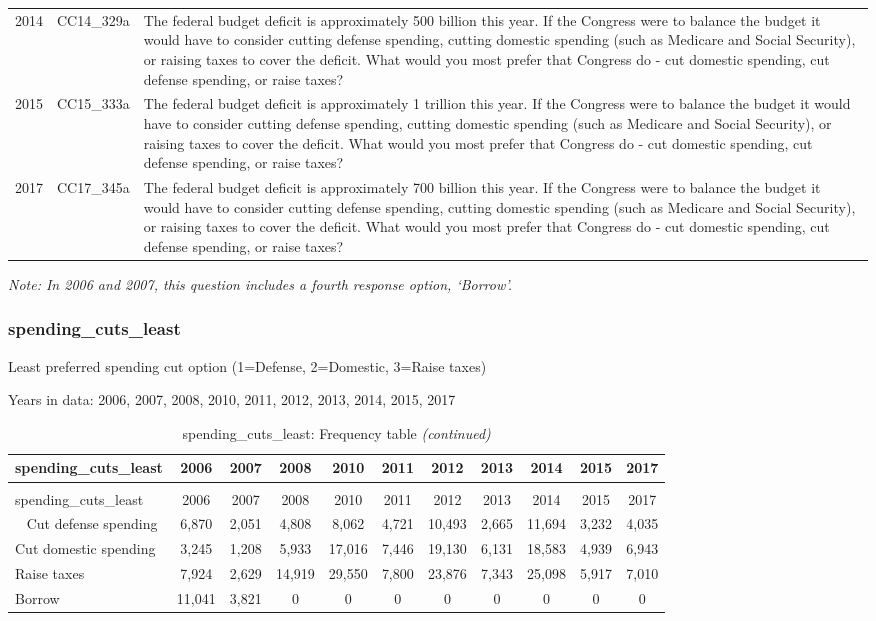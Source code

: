 \documentclass[12pt]{article}
\begin{document}
\begin{longtable}[t]{rl>{\raggedright\arraybackslash}p{10cm}}
2014 & CC14\_329a & The federal budget deficit is approximately 500 billion this year. If the Congress were to balance the budget it would have to consider cutting defense spending, cutting domestic spending (such as Medicare and Social Security), or raising taxes to cover the deficit. What would you most prefer that Congress do - cut domestic spending, cut defense spending, or raise taxes?\\
2015 & CC15\_333a & The federal budget deficit is approximately 1 trillion this year. If the Congress were to balance the budget it would have to consider cutting defense spending, cutting domestic spending (such as Medicare and Social Security), or raising taxes to cover the deficit. What would you most prefer that Congress do - cut domestic spending, cut defense spending, or raise taxes?\\
2017 & CC17\_345a & The federal budget deficit is approximately 700 billion this year. If the Congress were to balance the budget it would have to consider cutting defense spending, cutting domestic spending (such as Medicare and Social Security), or raising taxes to cover the deficit. What would you most prefer that Congress do - cut domestic spending, cut defense spending, or raise taxes?\\*
\end{longtable}

\emph{Note: In 2006 and 2007, this question includes a fourth response
option, `Borrow'.}

\subsubsection{spending\_cuts\_least}\label{spending_cuts_least}

Least preferred spending cut option (1=Defense, 2=Domestic, 3=Raise
taxes)

Years in data: 2006, 2007, 2008, 2010, 2011, 2012, 2013, 2014, 2015,
2017

\begin{longtable}[t]{lcccccccccc}
\caption{\label{tab:unnamed-chunk-4}spending\_cuts\_least: Frequency table}\\
\toprule
spending\_cuts\_least & 2006 & 2007 & 2008 & 2010 & 2011 & 2012 & 2013 & 2014 & 2015 & 2017\\
\midrule
\endfirsthead
\caption[]{spending\_cuts\_least: Frequency table \textit{(continued)}}\\
\toprule
spending\_cuts\_least & 2006 & 2007 & 2008 & 2010 & 2011 & 2012 & 2013 & 2014 & 2015 & 2017\\
\midrule
\endhead
\
\endfoot
\bottomrule
\endlastfoot
Cut defense spending & 6,870 & 2,051 & 4,808 & 8,062 & 4,721 & 10,493 & 2,665 & 11,694 & 3,232 & 4,035\\
Cut domestic spending & 3,245 & 1,208 & 5,933 & 17,016 & 7,446 & 19,130 & 6,131 & 18,583 & 4,939 & 6,943\\
Raise taxes & 7,924 & 2,629 & 14,919 & 29,550 & 7,800 & 23,876 & 7,343 & 25,098 & 5,917 & 7,010\\
Borrow & 11,041 & 3,821 & 0 & 0 & 0 & 0 & 0 & 0 & 0 & 0\\*
\end{longtable}
\end{document}
